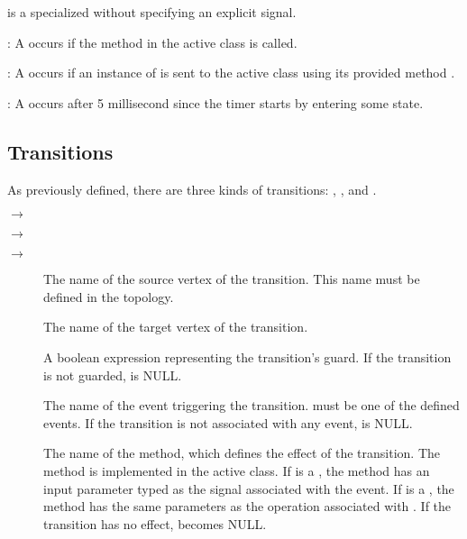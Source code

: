  is a specialized  without specifying an explicit signal.

\noindent
{}

: A  occurs if the method  in the active class is called.

: A  occurs if an instance of  is sent to the active class using its provided method .

: A  occurs after 5 millisecond since the timer starts by entering some state.

\subsection{Transitions}
As previously defined, there are three kinds of transitions: , , and .

\noindent
{}

\noindent
{} $\rightarrow$  

\noindent
{}$\rightarrow$

\noindent
{} $\rightarrow$ 

\noindent
{}
\begin{description}
	\item[] The name of the source vertex of the transition. 
	This name must be defined in the topology.
	
	\item[] The name of the target vertex of the transition. 
	
	\item[] A boolean expression representing the transition's guard. If the transition is not guarded,  is NULL.
	
	\item[] The name of the event triggering the transition. 
	 must be one of the defined events. 
	If the transition is not associated with any event,  is NULL.
	
	\item[] The name of the method, which defines the effect of the transition.
	The method is implemented in the active class.
	If  is a , the method has an input parameter typed as the signal associated with the event.
	If  is a , the method has the same parameters as the operation associated with .
	If the transition has no effect,  becomes NULL.
\end{description}

\noindent
{}